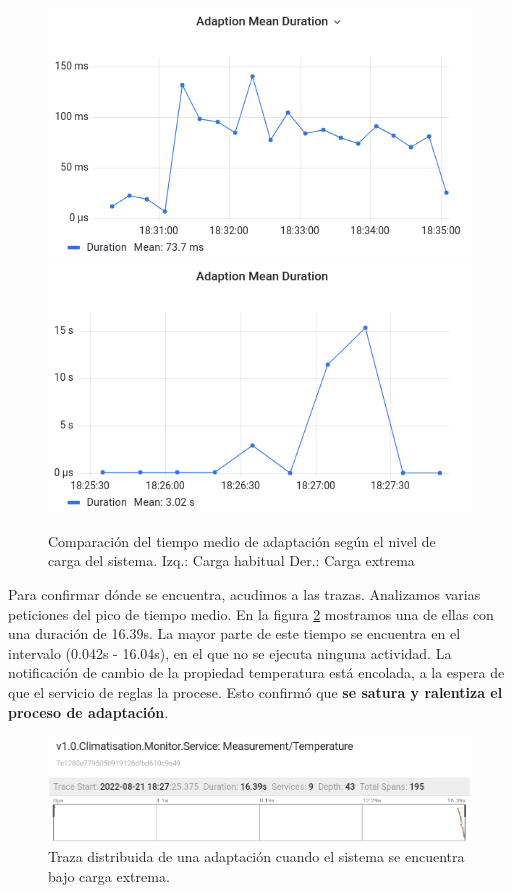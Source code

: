 \begin{figure}[h]
  \hspace{-1.2cm}
  \includegraphics[scale=0.42]{cap_despliegue/images/pruebas-carga-baseline}
  \includegraphics[scale=0.42]{cap_despliegue/images/pruebas-carga-extremo}
  \caption{Comparación del tiempo medio de adaptación según el nivel de carga del sistema. Izq.: Carga habitual Der.: Carga extrema}
  \label{fig:pruebas-carga}
\end{figure}

Para confirmar dónde se encuentra, acudimos a las trazas. Analizamos varias peticiones del pico de tiempo medio. En la figura \ref{fig:prueba-carga-traza} mostramos una de ellas con una duración de 16.39s. La mayor parte de este tiempo se encuentra en el intervalo (0.042s - 16.04s), en el que no se ejecuta ninguna actividad. La notificación de cambio de la propiedad temperatura está encolada, a la espera de que el servicio de reglas la procese. Esto confirmó que \textbf{se satura y ralentiza el proceso de adaptación}.

\begin{figure}[htb]
  \hspace{-0.2cm}
  \includegraphics[scale=0.45]{cap_despliegue/images/pruebas-carga-traza}
  \caption{Traza distribuida de una adaptación cuando el sistema se encuentra bajo carga extrema.}
  \label{fig:prueba-carga-traza}
\end{figure}

